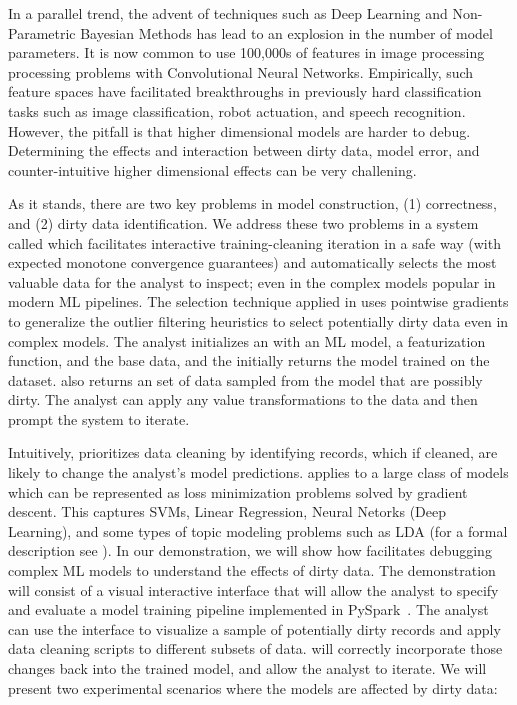 In a parallel trend, the advent of techniques such as Deep Learning and Non-Parametric Bayesian Methods has lead to an explosion in the number of model parameters.
It is now common to use 100,000s of features in image processing processing problems with Convolutional Neural Networks.
Empirically, such feature spaces have facilitated breakthroughs in previously hard classification tasks such as image classification, robot actuation, and speech recognition.
However, the pitfall is that higher dimensional models are harder to debug.
Determining the effects and interaction between dirty data, model error, and counter-intuitive higher dimensional effects can be very challening.

As it stands, there are two key problems in model construction, (1) correctness, and (2) dirty data identification.
We address these two problems in a system called \sys which facilitates interactive training-cleaning iteration in a safe way (with expected monotone convergence guarantees) and automatically selects the most valuable data for the analyst to inspect; even in the complex models popular in modern ML pipelines.
The selection technique applied in \sys uses pointwise gradients to generalize the outlier filtering heuristics to select potentially dirty data even in complex models. 
The analyst initializes an \sys with an ML model, a featurization function, and the base data, and the \sys initially returns the model trained on the dataset.
\sys also returns an set of data sampled from the model that are possibly dirty.
The analyst can apply any value transformations to the data and then prompt the system to iterate. 

Intuitively, \sys prioritizes data cleaning by identifying records, which if cleaned, are likely to change the analyst's model predictions.
\sys applies to a large class of models which can be represented as loss minimization problems solved by gradient descent.
This captures SVMs, Linear Regression, Neural Netorks (Deep Learning), and some types of topic modeling problems such as LDA (for a formal description see \cite{activecleanarxiv}).
In our demonstration, we will show how \sys facilitates debugging complex ML models to understand the effects of dirty data.
The demonstration will consist of a visual interactive interface that will allow the analyst to specify and evaluate a model training pipeline implemented in PySpark~\cite{pyspark}.
The analyst can use the interface to visualize a sample of potentially dirty records and apply data cleaning scripts to different subsets of data.
\sys will correctly incorporate those changes back into the trained model, and allow the analyst to iterate.  
We will present two experimental scenarios where the models are affected by dirty data: 


